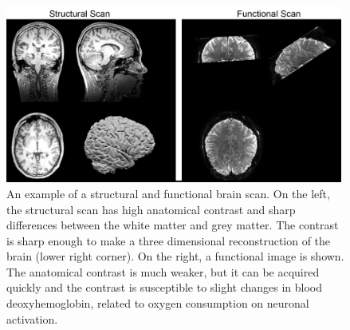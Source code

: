\begin{figure}[!ht]
	\centering
	\includegraphics[width=0.99\textwidth, clip=true]{./Chapters/01_Introduction/Images/MyBrain}
	\caption{An example of a structural and functional brain scan. On the left, the structural scan has high anatomical contrast and sharp differences between the white matter and grey matter. The contrast is sharp enough to make a three dimensional reconstruction of the brain (lower right corner). On the right, a functional image is shown. The anatomical contrast is much weaker, but it can be acquired quickly and the contrast is susceptible to slight changes in blood deoxyhemoglobin, related to oxygen consumption on neuronal activation.}
	\label{fig:mybrain}
\end{figure}